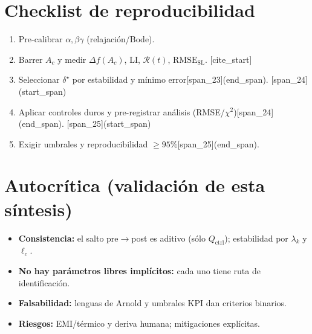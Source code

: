 \documentclass[11pt,letterpaper]{article}
\newcommand{\Qctrl}{Q_{\text{ctrl}}}
\newcommand{\LI}{\mathrm{LI}}
\newcommand{\RMSESL}{\mathrm{RMSE}_{\mathrm{SL}}}
\newcommand{\RR}{\mathcal{R}}
\newcommand{\Ac}{A_c}
\begin{document}
\section{Checklist de reproducibilidad}
\begin{enumerate}[label=\textbf{R\arabic*.}, leftmargin=*]
\item Pre-calibrar $\alpha,\beta\gamma$ (relajación/Bode).
\item Barrer $\Ac$ y medir $\Delta f(\Ac)$, $\LI$, $\RR(t)$, $\RMSESL$.
[cite_start]\item Seleccionar $\delta^\star$ por estabilidad y mínimo error[span_23](end_span).
[span_24](start_span)\item Aplicar controles duros y pre-registrar análisis (RMSE/$\chi^2$)[span_24](end_span).
[span_25](start_span)\item Exigir umbrales y reproducibilidad $\ge 95\%$[span_25](end_span).
\end{enumerate}

\section*{Autocrítica (validación de esta síntesis)}
\begin{itemize}[leftmargin=*]
    \item \textbf{Consistencia:} el salto pre$\rightarrow$post es aditivo (sólo $\Qctrl$); estabilidad por $\lambda_k$ y $\ell_c$.
    \item \textbf{No hay parámetros libres implícitos:} cada uno tiene ruta de identificación.
    \item \textbf{Falsabilidad:} lenguas de Arnold y umbrales KPI dan criterios binarios.
    \item \textbf{Riesgos:} EMI/térmico y deriva humana; mitigaciones explícitas.
\end{itemize}
\end{document}
